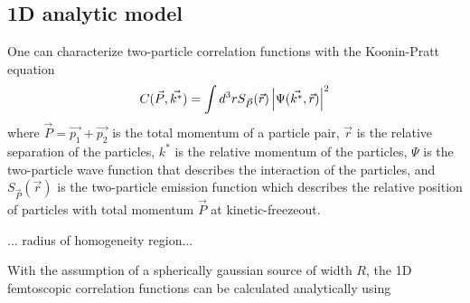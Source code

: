 \subsection{1D analytic model}
\label{sec:AnalyticModel}


One can characterize two-particle correlation functions with the Koonin-Pratt equation
\begin{equation}
\label{eq:KooninPratt}
C(\vec{P}, \vec{k^*}) =  \int d^3r S_{\vec{P}} (\vec{r}) \left\lvert\Psi(\vec{k^*},\vec{r})\right\rvert^2
\end{equation}
where $\vec{P} = \vec{p_1} + \vec{p_2}$ is the total momentum of a particle pair, $\vec{r}$ is the relative separation of the particles, $k^*$ is the relative momentum of the particles, $\Psi$ is the two-particle wave function that describes the interaction of the particles, and $S_{\vec{P}} (\vec{r})$ is the two-particle emission function which describes the relative position of particles with total momentum $\vec{P}$ at kinetic-freezeout.

... radius of homogeneity region...



With the assumption of a spherically gaussian source of width $R$, the 1D femtoscopic correlation functions can be calculated analytically \cite{lednicky82} using 

